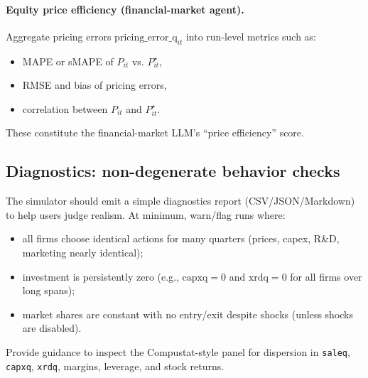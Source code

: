 \documentclass[11pt]{article}
\begin{document}
\paragraph{Equity price efficiency (financial-market agent).}
Aggregate pricing errors $\text{pricing\_error\_q}_{it}$ into run-level metrics such as:
\begin{itemize}[leftmargin=*]
    \item MAPE or sMAPE of $P_{it}$ vs. $P^{\star}_{it}$,
    \item RMSE and bias of pricing errors,
    \item correlation between $P_{it}$ and $P^{\star}_{it}$.
\end{itemize}
These constitute the financial-market LLM's ``price efficiency'' score.

\subsection{Diagnostics: non-degenerate behavior checks}
The simulator should emit a simple diagnostics report (CSV/JSON/Markdown) to help users judge realism. At minimum, warn/flag runs where:
\begin{itemize}[leftmargin=*]
    \item all firms choose identical actions for many quarters (prices, capex, R\&D, marketing nearly identical);
    \item investment is persistently zero (e.g., $\text{capxq}=0$ and $\text{xrdq}=0$ for all firms over long spans);
    \item market shares are constant with no entry/exit despite shocks (unless shocks are disabled).
\end{itemize}
Provide guidance to inspect the Compustat-style panel for dispersion in \texttt{saleq}, \texttt{capxq}, \texttt{xrdq}, margins, leverage, and stock returns.
\end{document}
